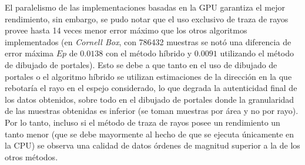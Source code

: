 El paralelismo de las implementaciones basadas en la GPU garantiza el mejor rendimiento, sin embargo, se pudo notar que el uso exclusivo de traza de rayos provee hasta 14 veces menor error máximo que los otros algoritmos implementados (en \textit{Cornell Box}, con 786432 muestras se notó una diferencia de error máxima $Ep$ de $0.0138$ con el método híbrido y  $0.0091$ utilizando el método de dibujado de portales). Esto se debe a que tanto en el uso de dibujado de portales o el algoritmo híbrido se utilizan estimaciones de la dirección en la que rebotaría el rayo en el espejo considerado, lo que degrada la autenticidad final de los datos obtenidos, sobre todo en el dibujado de portales donde la granularidad de las muestras obtenidas es inferior (se toman muestras por área y no por rayo). Por lo tanto, incluso si el método de traza de rayos posee un rendimiento un tanto menor (que se debe mayormente al hecho de que se ejecuta únicamente en la CPU) se observa una calidad de datos órdenes de magnitud superior a la de los otros métodos.

